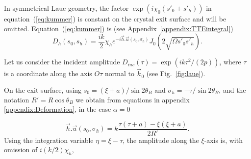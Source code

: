 \documentclass[preprint]{iucr}              %
\newcommand{\inred}[1]{{\color{red}#1}}
\begin{document}
\inred{In} symmetrical Laue geometry, the factor $\exp(i \chi_0 (s'_0+s'_h))$ in equation~(\ref{eq:kummer}) is constant \inred{ on the crystal exit surface and will be omitted. Equation~(\ref{eq:kummer}) is (see Appendix~\ref{appendix:TTEintegral})}
\begin{equation}
\label{eq:DhSymmetricalLaue}
    D_h(s_0,s_h) = \frac{i k}{2} \chi_h e^{-i \vec h . \vec u(s_0,\sigma_h)}
    J_0(2\sqrt{\Omega s'_0 s'_h}).
\end{equation}

Let us consider the incident amplitude $D_{inc}(\tau)=\exp(i k \tau^2/(2p))$, where $\tau$ is a coordinate along the axis $O\tau$ normal to $\vec k_0$ (see Fig.~\ref{fig:laue}). \inred{On the exit surface, using $s_0=(\xi+a)/\sin2\theta_B$ and $\sigma_h=-\tau/\sin2\theta_B$, and the notation $R'=R\cos\theta_B$ we obtain \inred{from equations in appendix \ref{appendix:Deformation}, in the case $\alpha=0$}

\begin{equation}
    \vec h . \vec u(s_0,\sigma_h) = k \frac{\tau(\tau+a)-\xi(\xi+a)}{ 2R'}.
\end{equation}
Using the integration variable $\eta=\xi-\tau$, the amplitude along the $\xi$-axis is, with omission of $i(k/2)\chi_h$,
}
\end{document}
